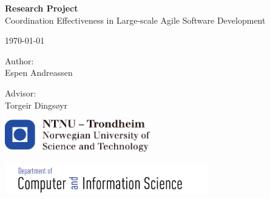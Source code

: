 \documentclass[12pt,a4paper,oneside]{report}
\begin{document}

\thispagestyle{empty}

\begin{center}
    {\Huge\textbf{Research Project}} \\
    \medskip
    {\huge Coordination Effectiveness in Large-scale Agile Software Development}

    \vspace{6.5cm}

    {\large \today}\\

    \vspace{0.5cm}

    {\Large Author:}\\
    {\large
    Espen Andreassen\\
    }

    \vspace{0.5cm}

    {\large
    Advisor:\\
    Torgeir Dingsøyr\\}

    \vspace{6.5cm}

    \includegraphics[trim = 2mm 0mm 0mm 0mm, width=2.5in]{images/logo-ntnu.pdf}

    \includegraphics[trim = 0mm 0mm 12mm 0mm, width=3.5in]{images/idi.pdf}

\end{center}

\newpage




\setcounter{tocdepth}{1}
\dominitoc
\dominilof
\dominilot
\tableofcontents
\clearpage
\listoffigures
\listoftables












\end{document}
